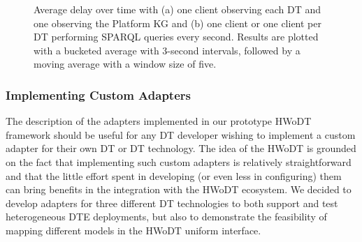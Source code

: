 \begin{figure}[ht]
    \centering
    \caption{Average delay over time with (a) one client observing each \ac{DT} and one observing the Platform \ac{KG} and (b) one client or one client per \ac{DT} performing SPARQL queries every second.
     Results are plotted with a bucketed average with 3-second intervals, followed by a moving average with a window size of five.}
    \label{fig:sequence-interactions}
\end{figure}


\subsubsection{Implementing Custom Adapters}
The description of the adapters implemented in our prototype \ac{HWoDT} framework should be useful for any \ac{DT} developer wishing to implement a custom adapter for their own \ac{DT} or \ac{DT} technology. 
%
The idea of the \ac{HWoDT} is grounded on the fact that implementing such custom adapters is relatively straightforward and that the little effort spent in developing (or even less in configuring) them can bring benefits in the integration with the \ac{HWoDT} ecosystem.
%
We decided to develop adapters for three different \ac{DT} technologies to both support and test heterogeneous \ac{DTE} deployments, but also to demonstrate the feasibility of mapping different models in the \ac{HWoDT} uniform interface.

